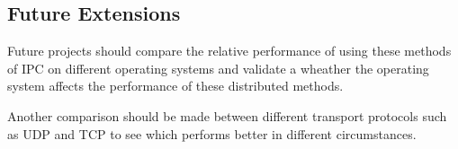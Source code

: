 \documentclass{article}
\begin{document}
\subsection{Future Extensions}
Future projects should compare the relative performance of using these methods of IPC on different operating systems and validate a wheather the operating system affects the performance of these distributed methods. 

Another comparison should be made between different transport protocols such as UDP and TCP to see which performs better in different circumstances.







\end{document}
